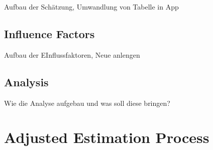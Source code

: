 Aufbau der Schätzung, Umwandlung von Tabelle in App

\subsection{Influence Factors}

Aufbau der EInflussfaktoren, Neue anlengen

\subsection{Analysis}

Wie die Analyse aufgebau und was soll diese bringen?

\section{Adjusted Estimation Process}


